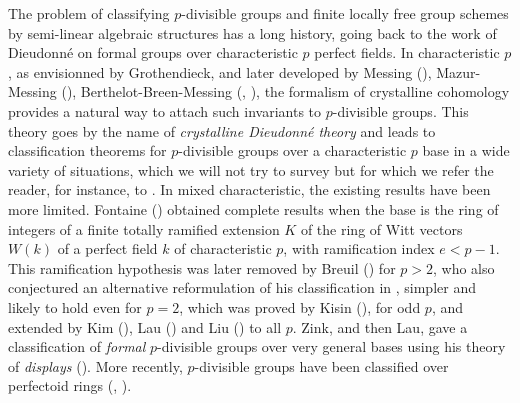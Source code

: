 \documentclass{amsart}
\theoremstyle{plain}
\theoremstyle{definition}
\begin{document}
The problem of classifying $p$-divisible groups and finite locally free group schemes by semi-linear algebraic structures has a long history, going back to the work of Dieudonn\'e on formal groups over characteristic $p$ perfect fields. In characteristic $p$, as envisionned by Grothendieck, and later developed by Messing (\cite{messing_the_crystals_associated_to_barsotti_tate_groups}), Mazur-Messing (\cite{mazur_messing_universal_extensions_and_one_dimensional_crystalline_cohomology}), Berthelot-Breen-Messing (\cite{berthelot_breen_messing_theorie_de_dieudonne_cristalline_II}, \cite{berthelot_messing_theorie_de_dieudonne_cristalline_III}), the formalism of crystalline cohomology provides a natural way to attach such invariants to $p$-divisible groups. This theory goes by the name of \textit{crystalline Dieudonn\'e theory} and leads to classification theorems for $p$-divisible groups over a characteristic $p$ base in a wide variety of situations, which we will not try to survey but for which we refer the reader, for instance, to \cite{lau_divided_dieudonne_crystals}. In mixed characteristic, the existing results have been more limited. Fontaine (\cite{fontaine_groupes_p_divisibles_sur_les_corps_locaux}) obtained complete results when the base is the ring of integers of a finite totally ramified extension $K$ of the ring of Witt vectors $W(k)$ of a perfect field $k$ of characteristic $p$, with ramification index $e<p-1$. This ramification hypothesis was later removed by Breuil (\cite{breuil_groupes_p_divisibles_groupes_finis_et_modules_filtres}) for $p>2$, who also conjectured an alternative reformulation of his classification in \cite{breuil_schemas_en_groupes_et_corps_de_normes}, simpler and likely to hold even for $p=2$, which was proved by Kisin (\cite{kisin_crystalline_representations_and_f_crystals}),  for odd $p$, and extended by Kim (\cite{kim_the_classification_of_p_divisible_groups_over_2_adic_discrete_valuation_rings}), Lau (\cite{lau_relations_between_dieudonne_displays_and_crystalline_dieudonne_theory}) and Liu (\cite{liu_the_correspondence_between_barsotti_tate_groups_and_kisin_modules_when_p_equal_2}) to all $p$. Zink, and then Lau, gave a classification of \textit{formal} $p$-divisible groups over very general bases using his theory of \textit{displays} (\cite{zink_the_display_of_a_formal_p_divisible_group}). More recently, $p$-divisible groups have been classified over perfectoid rings (\cite{lau_dieudonne_theory_over_semiperfect_rings_and_perfectoid_rings}, \cite[Appendix to Lecture XVII]{scholze2020berkeley}). 
\end{document}
